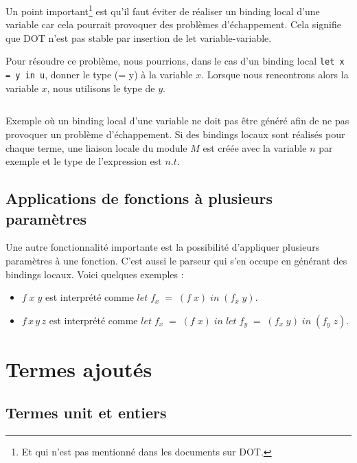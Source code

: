 Un point important\footnote{Et qui n'est pas mentionné dans les documents sur
DOT.} est qu'il faut éviter de réaliser un binding local d'une variable car
cela pourrait provoquer des problèmes d'échappement. Cela signifie que DOT n'est
pas stable par insertion de let variable-variable.

Pour résoudre ce problème, nous pourrions, dans le cas d'un binding local
\verb|let x = y in u|, donner le type (= y) à la variable $x$. Lorsque nous
rencontrons alors la variable $x$, nous utilisons le type de $y$.

\begin{listing}
  \label{code:implementation-grammar-terms-examples}
  \inputminted{OCaml}{codes/terms_binding_variable.rml}
  \caption{Exemple où un binding local d'une variable ne doit pas être généré
    afin de ne pas provoquer un problème d'échappement. Si des bindings locaux
    sont réalisés pour chaque terme, une liaison locale du module $M$ est
    créée avec la variable $n$ par exemple et le type de l'expression est $n.t$.}
\end{listing}

\subsection*{Applications de fonctions à plusieurs paramètres}

Une autre fonctionnalité importante est la possibilité d'appliquer plusieurs
paramètres à une fonction. C'est aussi le parseur qui s'en occupe en générant
des bindings locaux. Voici quelques exemples :

\begin{itemize}
\item $f \; x \; y$ est interprété comme $let \; f_{x} \; = \; (f \; x) \; in \;
  (f_{x} \; y)$.
\item $f \,  x \, y \, z$ est interprété comme $let \; f_{x} \; = \; (f \; x) \;
  in \; let \; f_{y} \; = \; (f_{x} \; y) \; in \; (f_{y} \; z)$.
\end{itemize}

\section{Termes ajoutés}

\subsection*{Termes unit et entiers}

